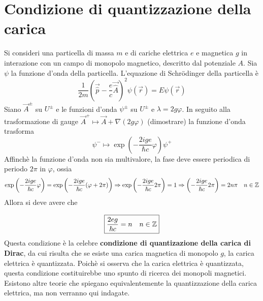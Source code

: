 
\section{Condizione di quantizzazione della carica}
Si consideri una particella di massa $m$ e di cariche elettrica $e$ e magnetica
$g$ in interazione con un campo di monopolo magnetico, descritto dal potenziale
$A$. Sia $\psi$ la funzione d'onda della particella. L'equazione di Schrödinger
della particella è
\begin{equation}
   \frac{1}{2m}\left( \vec{\hat{p}} - \frac{e}{c} \vec{\hat{A}} \right)^2 \psi(\vec r) = E\psi(\vec r)
\end{equation}
Siano $\vec A^\pm$ su $U^\pm$ e le funzioni d'onda $\psi^\pm$ su $U^\pm$ e $\lambda =2g\varphi$.
In seguito alla trasformazione di gauge $ \vec A^+ \mapsto \vec A + \nabla (2g\varphi)$ (dimostrare)
la funzione d'onda trasforma
$$ \psi^- \mapsto \exp \left( - \frac{2ige}{\hbar c} \varphi \right) \psi^+$$
Affinchè la funzione d'onda non sia multivalore, la fase deve essere periodica di
periodo $2\pi$ in $\varphi$, ossia
$$
   \exp \left( - \frac{2ige}{\hbar c} \varphi \right)
      = \exp \left( - \frac{2ige}{\hbar c} (\varphi + 2\pi) \right)
   \Rightarrow
   \exp \left( - \frac{2ige}{\hbar c} 2\pi \right) = 1
   \Rightarrow
   \left( - \frac{2ige}{\hbar c} 2\pi \right) = 2n\pi \quad n \in \mathbb{Z}
$$
Allora si deve avere che

\begin{equation}\label{eq:diracquantumcharge}
   \boxed{
      \frac{2eg}{\hbar c} = n \quad  n \in \mathbb{Z}
   }
\end{equation}
Questa condizione è la celebre \textbf{condizione di quantizazione della carica
di Dirac}, da cui risulta che se esiste una carica magnetica di monopolo $g$,
la carica elettrica è quantizzata. Poichè si osserva che la carica elettrica è
quantizzata, questa condizione costituirebbe uno spunto di ricerca dei monopoli
magnetici.\\
Esistono altre teorie che spiegano equivalentemente la quantizzazione della carica
elettrica, ma non verranno qui indagate.\\
